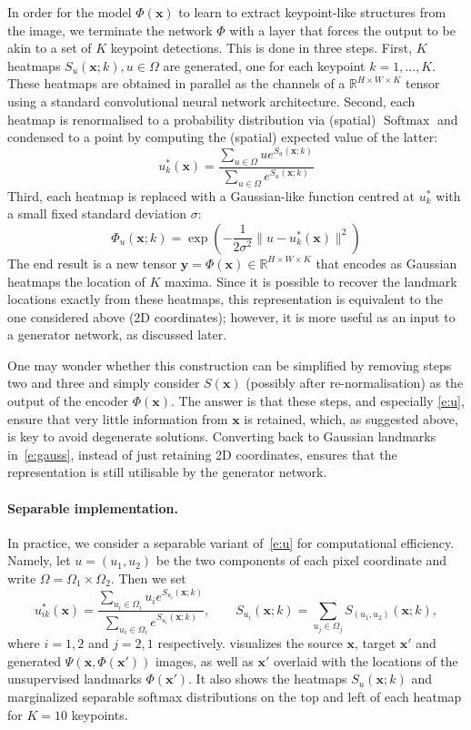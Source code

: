 \documentclass{article}
\newcommand{\bx}{\mathbf{x}}
\newcommand{\by}{\mathbf{y}}
\begin{document}
In order for the model $\Phi(\bx)$ to learn to extract keypoint-like structures from the image, we terminate the network $\Phi$ with a layer that forces the output to be akin to a set of $K$ keypoint detections. This is done in three steps. First, $K$ heatmaps $S_u(\bx;k), u\in\Omega$ are generated, one for each keypoint $k=1,\dots,K$. These heatmaps are obtained in parallel as the channels of a $\mathbb{R}^{H\times W\times K}$ tensor using a standard convolutional neural network architecture. Second, each heatmap is renormalised to a probability distribution via (spatial) $\operatorname{Softmax}$ and condensed to a point by computing the (spatial) expected value of the latter:
\begin{equation}\label{e:u}
  u^*_k(\bx)
  =
  \frac
  {\sum_{u\in\Omega} u e^{S_u(\bx;k)}}
  {\sum_{u\in\Omega}e^{S_u(\bx;k)}}
\end{equation}
Third, each heatmap is replaced with a Gaussian-like function centred at $u_k^*$ with a small fixed standard deviation $\sigma$:
\begin{equation}\label{e:gauss}
  \Phi_u(\bx;k) = \exp\left(
  -\frac{1}{2\sigma^2}
  \|
  u - u^*_k(\bx)
  \|^2
  \right)
\end{equation}
The end result is a new tensor $\by=\Phi(\bx) \in \mathbb{R}^{H\times W\times K}$ that encodes as Gaussian heatmaps the location of $K$ maxima. Since it is possible to recover the landmark locations exactly from these heatmaps, this representation is equivalent to the one considered above (2D coordinates); however, it is more useful as an input to a generator network, as discussed later.

One may wonder whether this construction can be simplified by removing steps two and three and simply consider $S(\bx)$ (possibly after re-normalisation) as the output of the encoder $\Phi(\bx)$. The answer is that these steps, and especially \cref{e:u}, ensure that very little information from $\bx$ is retained, which, as suggested above, is key to avoid degenerate solutions. Converting back to Gaussian landmarks in~\cref{e:gauss}, instead of just retaining 2D coordinates, ensures that the representation is still utilisable by the generator network.

\paragraph{Separable implementation.}

In practice, we consider a separable variant of~\cref{e:u} for computational efficiency. Namely, let $u=(u_1,u_2)$ be the two components of each pixel coordinate and write $\Omega = \Omega_1\times \Omega_2$. Then we set
$$
u_{ik}^*(\bx)
  =
  \frac
  {\sum_{u_i\in\Omega_i} u_i e^{S_{u_i}(\bx;k)}}
  {\sum_{u_i\in\Omega_i}e^{S_{u_i}(\bx;k)}},
  \qquad
  S_{u_i}(\bx;k) = \sum_{u_j\in\Omega_j}
  S_{(u_1,u_2)}(\bx;k),
$$
where $i=1,2$ and $j=2,1$ respectively.  visualizes the source $\bx$, target $\bx'$ and generated $\Psi(\bx,\Phi(\bx'))$ images, as well as $\bx'$ overlaid with the locations of the unsupervised landmarks $\Phi(\bx')$. It also shows the heatmaps $S_u(\bx;k)$ and marginalized separable softmax distributions on the top and left of each heatmap for $K=10$ keypoints.
\end{document}
